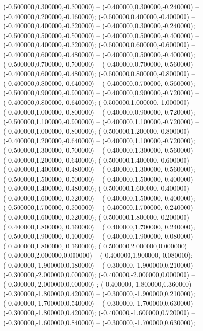  (-0.500000,0.300000,-0.300000) -- (-0.400000,0.300000,-0.240000) -- (-0.400000,0.200000,-0.160000);
 (-0.500000,0.400000,-0.400000) -- (-0.400000,0.400000,-0.320000) -- (-0.400000,0.300000,-0.240000);
 (-0.500000,0.500000,-0.500000) -- (-0.400000,0.500000,-0.400000) -- (-0.400000,0.400000,-0.320000);
 (-0.500000,0.600000,-0.600000) -- (-0.400000,0.600000,-0.480000) -- (-0.400000,0.500000,-0.400000);
 (-0.500000,0.700000,-0.700000) -- (-0.400000,0.700000,-0.560000) -- (-0.400000,0.600000,-0.480000);
 (-0.500000,0.800000,-0.800000) -- (-0.400000,0.800000,-0.640000) -- (-0.400000,0.700000,-0.560000);
 (-0.500000,0.900000,-0.900000) -- (-0.400000,0.900000,-0.720000) -- (-0.400000,0.800000,-0.640000);
 (-0.500000,1.000000,-1.000000) -- (-0.400000,1.000000,-0.800000) -- (-0.400000,0.900000,-0.720000);
 (-0.500000,1.100000,-0.900000) -- (-0.400000,1.100000,-0.720000) -- (-0.400000,1.000000,-0.800000);
 (-0.500000,1.200000,-0.800000) -- (-0.400000,1.200000,-0.640000) -- (-0.400000,1.100000,-0.720000);
 (-0.500000,1.300000,-0.700000) -- (-0.400000,1.300000,-0.560000) -- (-0.400000,1.200000,-0.640000);
 (-0.500000,1.400000,-0.600000) -- (-0.400000,1.400000,-0.480000) -- (-0.400000,1.300000,-0.560000);
 (-0.500000,1.500000,-0.500000) -- (-0.400000,1.500000,-0.400000) -- (-0.400000,1.400000,-0.480000);
 (-0.500000,1.600000,-0.400000) -- (-0.400000,1.600000,-0.320000) -- (-0.400000,1.500000,-0.400000);
 (-0.500000,1.700000,-0.300000) -- (-0.400000,1.700000,-0.240000) -- (-0.400000,1.600000,-0.320000);
 (-0.500000,1.800000,-0.200000) -- (-0.400000,1.800000,-0.160000) -- (-0.400000,1.700000,-0.240000);
 (-0.500000,1.900000,-0.100000) -- (-0.400000,1.900000,-0.080000) -- (-0.400000,1.800000,-0.160000);
 (-0.500000,2.000000,0.000000) -- (-0.400000,2.000000,0.000000) -- (-0.400000,1.900000,-0.080000);
 (-0.400000,-1.900000,0.180000) -- (-0.300000,-1.900000,0.210000) -- (-0.300000,-2.000000,0.000000);
 (-0.400000,-2.000000,0.000000) -- (-0.300000,-2.000000,0.000000) ;
 (-0.400000,-1.800000,0.360000) -- (-0.300000,-1.800000,0.420000) -- (-0.300000,-1.900000,0.210000);
 (-0.400000,-1.700000,0.540000) -- (-0.300000,-1.700000,0.630000) -- (-0.300000,-1.800000,0.420000);
 (-0.400000,-1.600000,0.720000) -- (-0.300000,-1.600000,0.840000) -- (-0.300000,-1.700000,0.630000);
